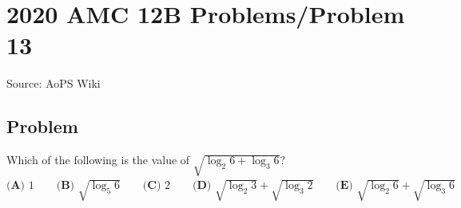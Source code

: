 \documentclass[12pt]{article}
\begin{document}
\section*{{2020 AMC 12B Problems/Problem 13}}
Source: AoPS Wiki

\subsection*{Problem}
Which of the following is the value of $\sqrt{\log_2{6}+\log_3{6}}?$ $\textbf{(A) } 1 \qquad\textbf{(B) } \sqrt{\log_5{6}} \qquad\textbf{(C) } 2 \qquad\textbf{(D) } \sqrt{\log_2{3}}+\sqrt{\log_3{2}} \qquad\textbf{(E) } \sqrt{\log_2{6}}+\sqrt{\log_3{6}}$
\end{document}
